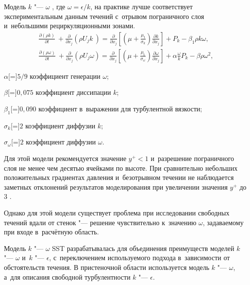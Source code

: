 
Модель \(k\) "--- \(\omega\) \autocite{Wilcox1988}, где \(\omega=\epsilon / k\), на практике лучше соответствует экспериментальным данным течений с~отрывом пограничного слоя и~небольшими рециркуляционными зонами.
\begin{subequations}
	\begin{gather}
	\frac{\partial(\rho k)}{\partial t}~+ \frac{\partial}{\partial x_j}\left(\rho U_j k~\right) = \frac{\partial}{\partial x_j} \left[ \left(\mu+\frac{\mu_\text{t}}{\sigma_k} \right) \frac{\partial k}{\partial x_j} \right] + P_k - \beta_1 \rho k\omega, \\
	\frac{\partial(\rho \omega)}{\partial t}~+ \frac{\partial}{\partial x_j}\left(\rho U_j \omega \right) = \frac{\partial}{\partial x_j} \left[ \left(\mu+\frac{\mu_\text{t}}{\sigma_\omega} \right) \frac{\partial \omega}{\partial x_j} \right] + \alpha\frac{\omega}{k}P_k - \beta\rho\omega^2,
	\end{gather}
\end{subequations}
\begin{eqexpl}
	\item{\(\alpha\)}[=]\(5/9\) коэффициент генерации \(\omega\);
	\item{\(\beta\)}[=]\(0,075\) коэффициент диссипации \(k\);
	\item{\(\beta_{1}\)}[=]\(0,090\) коэффициент в~выражении для турбулентной вязкости;
	\item{\(\sigma_k\)}[=]\(2\) коэффициент диффузии \(k\);
	\item{\(\sigma_\omega\)}[=]\(2\) коэффициент диффузии \(\omega\).
\end{eqexpl}

Для этой модели рекомендуется значение \(y^+ <1\) и~разрешение пограничного слоя не менее чем десятью ячейками по высоте.
При сравнительно небольших положительных градиентах давления и~безотрывном течении не наблюдается заметных отклонений результатов моделирования при увеличении значения \(y^+\) до 3 \autocite{Menter1994}.

Однако для этой модели существует проблема при исследовании свободных течений вдали от стенок "--- решение чувствительно к~значению \(\omega\), задаваемому при входе в~расчётную область.

Модель \(k\) "--- \(\omega\) SST \autocite{Menter1994} разрабатывалась для объединения преимуществ моделей \(k\) "--- \(\omega\) и~\(k\) "--- \(\epsilon\), с~переключением используемого подхода в~зависимости от обстоятельств течения.
В пристеночной области используется модель \(k\) "--- \(\omega\), а~для описания свободной турбулентности \(k\) "--- \(\epsilon\).

